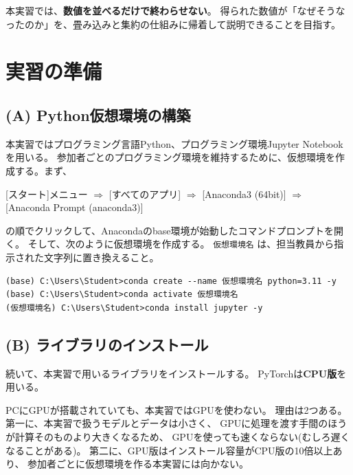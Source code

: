 \documentclass[11pt,a4paper]{jsarticle}
\begin{document}
本実習では、\textbf{数値を並べるだけで終わらせない}。
得られた数値が「なぜそうなったのか」を、畳み込みと集約の仕組みに帰着して説明できることを目指す。

\section{実習の準備}

\subsection*{(A) Python仮想環境の構築}

本実習ではプログラミング言語Python、プログラミング環境Jupyter Notebookを用いる。
参加者ごとのプログラミング環境を維持するために、仮想環境を作成する。まず、

\begin{center}
[スタート]メニュー $\Longrightarrow$ [すべてのアプリ] $\Longrightarrow$ [Anaconda3 (64bit)] $\Longrightarrow$ [Anaconda Prompt (anaconda3)]
\end{center}

\noindent
の順でクリックして、Anacondaのbase環境が始動したコマンドプロンプトを開く。
そして、次のように仮想環境を作成する。
\verb|仮想環境名| は、担当教員から指示された文字列に置き換えること。

\begin{screen}
\begin{small}
\begin{verbatim}
(base) C:\Users\Student>conda create --name 仮想環境名 python=3.11 -y
(base) C:\Users\Student>conda activate 仮想環境名
(仮想環境名) C:\Users\Student>conda install jupyter -y
\end{verbatim}
\end{small}
\end{screen}

\subsection*{(B) ライブラリのインストール}

続いて、本実習で用いるライブラリをインストールする。
PyTorchは\textbf{CPU版}を用いる。

PCにGPUが搭載されていても、本実習ではGPUを使わない。
理由は2つある。
第一に、本実習で扱うモデルとデータは小さく、
GPUに処理を渡す手間のほうが計算そのものより大きくなるため、
GPUを使っても速くならない(むしろ遅くなることがある)。
第二に、GPU版はインストール容量がCPU版の10倍以上あり、
参加者ごとに仮想環境を作る本実習には向かない。
\end{document}
